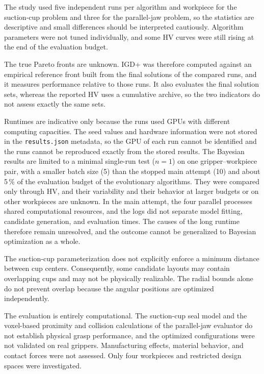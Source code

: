 The study used five independent runs per algorithm and workpiece for the
suction-cup problem and three for the parallel-jaw problem, so the statistics are
descriptive and small differences should be interpreted cautiously. Algorithm
parameters were not tuned individually, and some HV curves were still rising at
the end of the evaluation budget.

The true Pareto fronts are unknown. IGD+ was therefore computed against an
empirical reference front built from the final solutions of the compared runs,
and it measures performance relative to those runs. It also evaluates the final
solution sets, whereas the reported HV uses a cumulative archive, so the two
indicators do not assess exactly the same sets.

Runtimes are indicative only because the runs used GPUs with different computing
capacities. The seed values and hardware information were not stored in the
\texttt{results.json} metadata, so the GPU of each run cannot be identified and
the runs cannot be reproduced exactly from the stored results. The Bayesian
results are limited to a minimal single-run test ($n=1$) on one
gripper--workpiece pair, with a smaller batch size (5) than the stopped main
attempt (10) and about 5\,\% of the evaluation budget of the evolutionary
algorithms. They were compared only through HV, and their variability and their
behavior at larger budgets or on other workpieces are unknown. In the main
attempt, the four parallel processes shared computational resources, and the
logs did not separate model fitting, candidate generation, and evaluation times.
The causes of the long runtime therefore remain unresolved, and the outcome
cannot be generalized to Bayesian optimization as a whole.

The suction-cup parameterization does not explicitly enforce a minimum
distance between cup centers. Consequently, some candidate layouts may
contain overlapping cups and may not be physically realizable. The
radial bounds alone do not prevent overlap because the angular positions
are optimized independently.

The evaluation is entirely computational. The suction-cup seal model and
the voxel-based proximity and collision calculations of the parallel-jaw
evaluator do not establish physical grasp performance, and the optimized
configurations were not validated on real grippers. Manufacturing effects,
material behavior, and contact forces were not assessed. Only four
workpieces and restricted design spaces were investigated.

